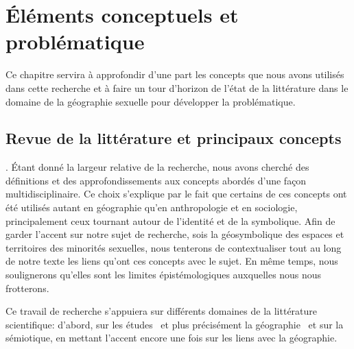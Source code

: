 \chapter{Éléments conceptuels et problématique}
\label{cha:elements_conceptuels_et_problematique}


Ce chapitre servira à approfondir d'une part les concepts que nous avons utilisés dans cette recherche et à faire un tour d'horizon de l'état de la littérature dans le domaine de la géographie sexuelle pour développer la problématique.

\section{Revue de la littérature et principaux concepts}
\label{sec:revue_de_la_litterature_et_principaux_concepts} 

.
Étant donné la largeur relative de la recherche, nous avons cherché des définitions et des approfondissements aux concepts abordés d'une façon multidisciplinaire. 
Ce choix s'explique par le fait que certains de ces concepts ont été utilisés autant en géographie qu'en anthropologie et en sociologie, principalement ceux tournant autour de l'identité et de la symbolique. 
Afin de garder l’accent sur notre sujet de recherche, sois la géosymbolique des espaces et territoires des minorités sexuelles, nous tenterons de contextualiser tout au long de notre texte les liens qu'ont ces concepts avec le sujet. 
En même temps, nous soulignerons qu’elles sont les limites épistémologiques auxquelles nous nous frotterons. 

Ce travail de recherche s’appuiera sur différents domaines de la littérature scientifique: d'abord, sur les études \qus\ et plus précisément la géographie \qu\ et sur la sémiotique, en mettant l'accent encore une fois sur les liens avec la géographie. 

